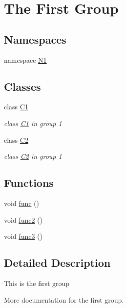 \hypertarget{group__group1}{\section{The First Group}
\label{group__group1}
}
\subsection*{Namespaces}
\begin{DoxyCompactItemize}
\item 
namespace \hyperlink{namespace_n1}{N1}
\end{DoxyCompactItemize}
\subsection*{Classes}
\begin{DoxyCompactItemize}
\item 
class \hyperlink{class_c1}{C1}
\begin{DoxyCompactList}\small\item\em class \hyperlink{class_c1}{C1} in group 1 \end{DoxyCompactList}\item 
class \hyperlink{class_c2}{C2}
\begin{DoxyCompactList}\small\item\em class \hyperlink{class_c2}{C2} in group 1 \end{DoxyCompactList}\end{DoxyCompactItemize}
\subsection*{Functions}
\begin{DoxyCompactItemize}
\item 
void \hyperlink{group__group1_ga24f647174760cac13d2624b5ad74b00c}{func} ()
\item 
void \hyperlink{group__group1_ga053929c0809a5f56f7548fd7d9968f31}{func2} ()
\item 
void \hyperlink{group__group1_gadbf675591ff057ec48ce35b0d5cdf755}{func3} ()
\end{DoxyCompactItemize}


\subsection{Detailed Description}
This is the first group

More documentation for the first group. 

